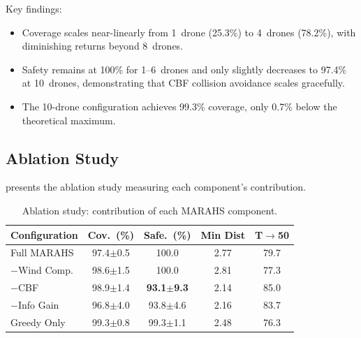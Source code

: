 \documentclass[12pt,a4paper,twocolumn]{article}
\begin{document}
\begin{enumerate}[leftmargin=*]
Key findings:
\begin{itemize}[leftmargin=*]
    \item Coverage scales near-linearly from 1~drone (25.3\%) to 4~drones (78.2\%), with diminishing returns beyond 8~drones.
    \item Safety remains at 100\% for 1--6~drones and only slightly decreases to 97.4\% at 10~drones, demonstrating that CBF collision avoidance scales gracefully.
    \item The 10-drone configuration achieves 99.3\% coverage, only 0.7\% below the theoretical maximum.
\end{itemize}

\subsection{Ablation Study}
\label{sec:ablation}

 presents the ablation study measuring each component's contribution.

\begin{table}[t]
\centering
\caption{Ablation study: contribution of each MARAHS component.}
\label{tab:ablation}
\small
\begin{tabular}{lcccc}
\toprule
\textbf{Configuration} & \textbf{Cov.\ (\%)} & \textbf{Safe.\ (\%)} & \textbf{Min Dist} & \textbf{T$\to$50} \\
\midrule
Full MARAHS   & 97.4$\pm$0.5 & 100.0 & 2.77 & 79.7 \\
$-$Wind Comp. & 98.6$\pm$1.5 & 100.0 & 2.81 & 77.3 \\
$-$CBF        & 98.9$\pm$1.4 & \textbf{93.1}$\pm$\textbf{9.3} & 2.14 & 85.0 \\
$-$Info Gain  & 96.8$\pm$4.0 & 93.8$\pm$4.6 & 2.16 & 83.7 \\
Greedy Only   & 99.3$\pm$0.8 & 99.3$\pm$1.1 & 2.48 & 76.3 \\
\bottomrule
\end{tabular}
\end{table}


\end{enumerate}
\end{document}
